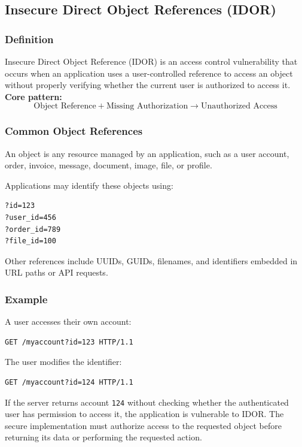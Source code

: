 \documentclass[11pt,a4paper]{article}
\begin{document}
\subsection{Insecure Direct Object References (IDOR)}

\subsubsection{Definition}

Insecure Direct Object Reference (IDOR) is an access control vulnerability that occurs when an application uses a user-controlled reference to access an object without properly verifying whether the current user is authorized to access it.
\textbf{Core pattern:}
\[
    \text{Object Reference}
    +
    \text{Missing Authorization}
    \rightarrow
    \text{Unauthorized Access}
\]

\subsubsection{Common Object References}

An object is any resource managed by an application, such as a user account, order, invoice, message, document, image, file, or profile.

Applications may identify these objects using:
\begin{lstlisting}
?id=123
?user_id=456
?order_id=789
?file_id=100
\end{lstlisting}

Other references include UUIDs, GUIDs, filenames, and identifiers embedded in URL paths or API requests.

\subsubsection{Example}

A user accesses their own account:
\begin{lstlisting}[language=HTTP]
GET /myaccount?id=123 HTTP/1.1
\end{lstlisting}

The user modifies the identifier:
\begin{lstlisting}[language=HTTP]
GET /myaccount?id=124 HTTP/1.1
\end{lstlisting}

If the server returns account \texttt{124} without checking whether the authenticated user has permission to access it, the application is vulnerable to IDOR.
The secure implementation must authorize access to the requested object before returning its data or performing the requested action.
\end{document}
